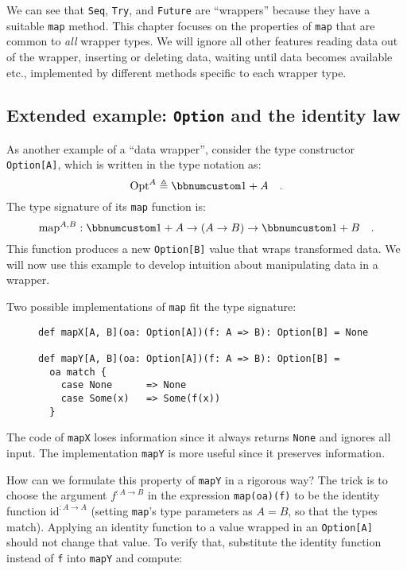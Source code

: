 We can see that \lstinline!Seq!, \lstinline!Try!, and \lstinline!Future!
are \textsf{``}wrappers\textsf{''} because they have a suitable \lstinline!map! method.
This chapter focuses on the properties of \lstinline!map! that are
common to \emph{all} wrapper types. We will ignore all other features
\textemdash{} reading data out of the wrapper, inserting or deleting
data, waiting until data becomes available etc., \textemdash{} implemented
by different methods specific to each wrapper type.

\subsection{Extended example: \texttt{Option} and the identity law\label{subsec:f-Example:-Option-and}}

As another example of a \textsf{``}data wrapper\textsf{''}, consider the type constructor
\lstinline!Option[A]!, which is written in the type notation as:
\[
\text{Opt}^{A}\triangleq\bbnum 1+A\quad.
\]
The type signature of its \lstinline!map! function is:
\[
\text{map}^{A,B}:\bbnum 1+A\rightarrow\left(A\rightarrow B\right)\rightarrow\bbnum 1+B\quad.
\]
This function produces a new \lstinline!Option[B]! value that wraps
transformed data. We will now use this example to develop intuition
about manipulating data in a wrapper.

Two possible implementations of \lstinline!map! fit the type signature:

\begin{wrapfigure}{l}{0.585\columnwidth}%
\vspace{-0.7\baselineskip}
\begin{lstlisting}
def mapX[A, B](oa: Option[A])(f: A => B): Option[B] = None

def mapY[A, B](oa: Option[A])(f: A => B): Option[B] =
  oa match {
    case None      => None
    case Some(x)   => Some(f(x))
  }
\end{lstlisting}
\vspace{-1\baselineskip}
\end{wrapfigure}%

\noindent The code of \lstinline!mapX! loses information
since it always returns \lstinline!None! and ignores all input. The
implementation \lstinline!mapY! is more useful since it preserves
information. 

How can we formulate this property of \lstinline!mapY! in a rigorous
way? The trick is to choose the argument $f^{:A\rightarrow B}$ in
the expression \lstinline!map(oa)(f)! to be the identity function
$\text{id}^{:A\rightarrow A}$ (setting \lstinline!map!\textsf{'}s type parameters
as $A=B$, so that the types match). Applying an identity function
to a value wrapped in an \lstinline!Option[A]! should not change
that value. To verify that, substitute the identity function instead
of \lstinline!f! into \lstinline!mapY! and compute:

